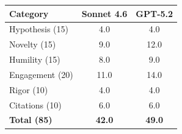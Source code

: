 \documentclass[11pt]{article}
\begin{document}
\medskip

\begin{tabular}{lcc}
\toprule
\textbf{Category} & \textbf{Sonnet 4.6} & \textbf{GPT-5.2} \\
\midrule
Hypothesis (15) & 4.0 & 4.0 \\
Novelty (15) & 9.0 & 12.0 \\
Humility (15) & 8.0 & 9.0 \\
Engagement (20) & 11.0 & 14.0 \\
Rigor (10) & 4.0 & 4.0 \\
Citations (10) & 6.0 & 6.0 \\
\midrule
\textbf{Total (85)} & \textbf{42.0} & \textbf{49.0} \\
\bottomrule
\end{tabular}

\bigskip
\end{document}
